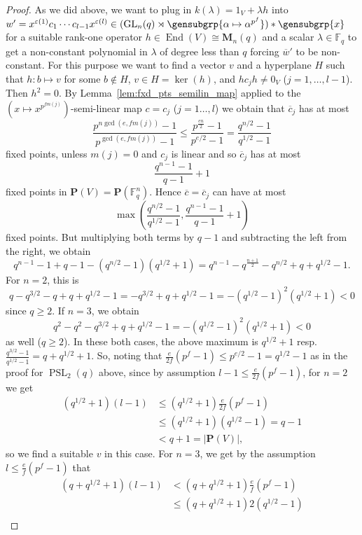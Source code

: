 \documentclass[a4paper,11pt]{amsproc}
\newcommand{\card}[1]{\left\lvert#1\right\rvert}%
\newcommand{\finfield}{\mathbb{F}}%
\newcommand{\M}{\mathbf{M}}%
\DeclareMathOperator{\End}{End}%
\DeclareMathOperator{\GL}{GL}%
\DeclareMathOperator{\PSL}{PSL}%
\newcommand{\proj}{\mathbf P}%
\theoremstyle{plain}
\theoremstyle{definition}
\begin{document}
	\begin{proof}
		As we did above, we want to plug in $k(\lambda)=1_V+\lambda h$ into $w'=x^{\varepsilon(1)}c_1\cdots c_{l-1}x^{\varepsilon(l)}\in(\GL_n(q)\rtimes\gensubgrp{\alpha\mapsto\alpha^{p^f}})\ast\gensubgrp{x}$ for a suitable rank-one operator $h\in\End(V)\cong\M_n(q)$ and a scalar $\lambda\in\finfield_q$ to get a non-constant polynomial in $\lambda$ of degree less than $q$ forcing $\overline{w}'$ to be non-constant. For this purpose we want to find a vector $v$ and a hyperplane $H$ such that $h\colon b\mapsto v$ for some $b\notin H$, $v\in H=\ker(h)$, and $hc_j h\neq 0_V$ ($j=1,\ldots,l-1$). Then $h^2=0$. By Lemma~\ref{lem:fxd_pts_semilin_map} applied to the $(x\mapsto x^{p^{f m(j)}})$-semi-linear map $c=c_j$ ($j=1\ldots,l$) we obtain that $\overline{c}_j$ has at most 
		$$\frac{p^{n\gcd(e,f m(j))}-1}{p^{\gcd(e,f m(j))}-1}\leq \frac{p^{\frac{en}{2}}-1}{p^{e/2}-1}=\frac{q^{n/2}-1}{q^{1/2}-1}
		$$ 
		fixed points, unless $m(j)=0$ and $c_j$ is linear and so $\overline{c}_j$ has at most 
		$$
		\frac{q^{n-1}-1}{q-1}+1
		$$
		fixed points in $\proj(V)=\proj(\finfield_q^n)$. Hence $\overline{c}=\overline{c}_j$ can have at most
		$$
		\max\left(\frac{q^{n/2}-1}{q^{1/2}-1},\frac{q^{n-1}-1}{q-1}+1\right)
		$$ 
		fixed points. But multiplying both terms by $q-1$ and subtracting the left from the right, we obtain
		$$q^{n-1}-1+q-1-(q^{n/2}-1)(q^{1/2}+1)=q^{n-1}-q^{\frac{n+1}{2}}-q^{n/2}+q+q^{1/2}-1.
		$$ 
		For $n=2$, this is 
		$$
		q-q^{3/2}-q+q+q^{1/2}-1=-q^{3/2}+q+q^{1/2}-1=-(q^{1/2}-1)^2(q^{1/2}+1)<0
		$$ 
		since $q\geq2$. If $n=3$, we obtain
		$$
		q^2-q^2-q^{3/2}+q+q^{1/2}-1=-(q^{1/2}-1)^2(q^{1/2}+1)<0
		$$
		as well ($q\geq2$). In these both cases, the above maximum is $q^{1/2}+1$ resp.\ $\frac{q^{3/2}-1}{q^{1/2}-1}=q+q^{1/2}+1$. So, noting that $\frac{e}{2f}(p^f-1)\leq p^{e/2}-1=q^{1/2}-1$ as in the proof for $\PSL_2(q)$ above, since by assumption $l-1\leq\frac{e}{2f}(p^f-1)$, for $n=2$ we get
		\begin{align*}
			(q^{1/2}+1)(l-1) & \leq (q^{1/2}+1)\frac{e}{2f}(p^f-1)\\
			& \leq(q^{1/2}+1)(q^{1/2}-1)=q-1\\
			& <q+1=\card{\proj(V)},
		\end{align*}
		so we find a suitable $v$ in this case. For $n=3$, we get by the assumption $l\leq\frac{e}{f}(p^f-1)$ that
		\begin{align*}
			(q+q^{1/2}+1)(l-1) &<(q+q^{1/2}+1)\frac{e}{f}(p^f-1)\\
			& \leq(q+q^{1/2}+1)2(q^{1/2}-1)\\

\end{align*}
\end{proof}
\end{document}

